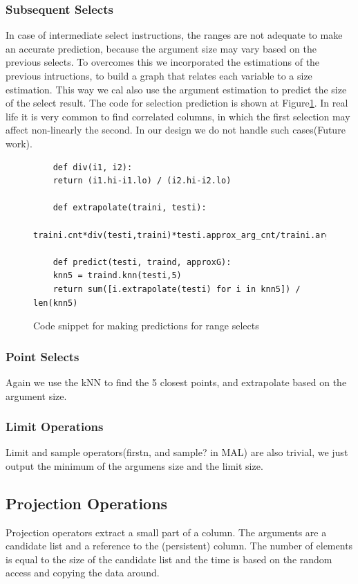 \documentclass[conference]{IEEEtran}
\begin{document}
\subsubsection{Subsequent Selects}
In case of intermediate select instructions, the ranges are not adequate to
make an accurate prediction, because the argument size may vary based on the
previous selects. To overcomes this we incorporated the estimations of the
previous intructions, to build a graph that relates each variable to a size
estimation. This way we cal also use the argument estimation to predict the
size of the select result. The code for selection prediction is shown at
Figure\ref{sel:code}. In real life it is very common to find correlated columns,
in which the first selection may affect non-linearly the second.
In our design we do not handle such cases(Future work).

\begin{figure}[t]
	\begin{verbatim}
	def div(i1, i2):
	return (i1.hi-i1.lo) / (i2.hi-i2.lo)
	
	def extrapolate(traini, testi):
	traini.cnt*div(testi,traini)*testi.approx_arg_cnt/traini.argcnt
	
	def predict(testi, traind, approxG):
	knn5 = traind.knn(testi,5)
	return sum([i.extrapolate(testi) for i in knn5]) / len(knn5)
	\end{verbatim}
	\caption{Code snippet for making predictions for range selects}
	\label{sel:code}
\end{figure}

\subsubsection{Point Selects}
Again we use the kNN to find the 5 closest points,
and extrapolate based on the argument size.
\subsubsection{Limit Operations}
Limit and sample operators(firstn, and sample? in MAL) are also trivial,
we just output the minimum of the argumens size and the limit size.

\subsection{Projection Operations}
Projection operators extract a small part of a column. The arguments are a candidate list and a reference to the (persistent) column. The number of elements is equal to the size of the candidate list and the time is based on the random access and copying the data around.
\end{document}
